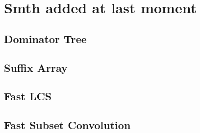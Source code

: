 \section{Smth added at last moment}

\subsection{Dominator Tree}


\subsection{Suffix Array}


\subsection{Fast LCS}


\subsection{Fast Subset Convolution}

